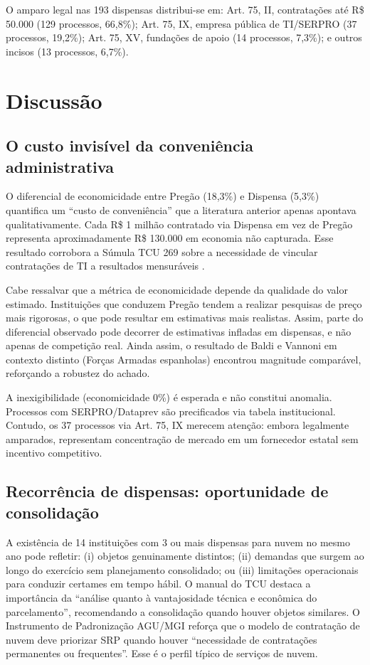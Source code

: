 \documentclass[12pt]{article}
\begin{document}
O amparo legal nas 193 dispensas distribui-se em: Art. 75, II, contratações até R\$ 50.000 (129 processos, 66,8\%); Art. 75, IX, empresa pública de TI/SERPRO (37 processos, 19,2\%); Art. 75, XV, fundações de apoio (14 processos, 7,3\%); e outros incisos (13 processos, 6,7\%).

\section{Discussão}
\label{sec:discussao}

\subsection{O custo invisível da conveniência administrativa}

O diferencial de economicidade entre Pregão (18,3\%) e Dispensa (5,3\%) quantifica um ``custo de conveniência'' que a literatura anterior apenas apontava qualitativamente. Cada R\$ 1 milhão contratado via Dispensa em vez de Pregão representa aproximadamente R\$ 130.000 em economia não capturada. Esse resultado corrobora a Súmula TCU 269 sobre a necessidade de vincular contratações de TI a resultados mensuráveis \cite{tcu2020acordao1503}.

Cabe ressalvar que a métrica de economicidade depende da qualidade do valor estimado. Instituições que conduzem Pregão tendem a realizar pesquisas de preço mais rigorosas, o que pode resultar em estimativas mais realistas. Assim, parte do diferencial observado pode decorrer de estimativas infladas em dispensas, e não apenas de competição real. Ainda assim, o resultado de Baldi e Vannoni \cite{baldi2018econometric} em contexto distinto (Forças Armadas espanholas) encontrou magnitude comparável, reforçando a robustez do achado.

A inexigibilidade (economicidade 0\%) é esperada e não constitui anomalia. Processos com SERPRO/Dataprev são precificados via tabela institucional. Contudo, os 37 processos via Art. 75, IX merecem atenção: embora legalmente amparados, representam concentração de mercado em um fornecedor estatal sem incentivo competitivo.

\subsection{Recorrência de dispensas: oportunidade de consolidação}

A existência de 14 instituições com 3 ou mais dispensas para nuvem no mesmo ano pode refletir: (i) objetos genuinamente distintos; (ii) demandas que surgem ao longo do exercício sem planejamento consolidado; ou (iii) limitações operacionais para conduzir certames em tempo hábil. O manual do TCU \cite{tcu2024licitacoes} destaca a importância da ``análise quanto à vantajosidade técnica e econômica do parcelamento'', recomendando a consolidação quando houver objetos similares. O Instrumento de Padronização AGU/MGI \cite{agu2023padronizacao} reforça que o modelo de contratação de nuvem deve priorizar SRP quando houver ``necessidade de contratações permanentes ou frequentes''. Esse é o perfil típico de serviços de nuvem.
\end{document}
